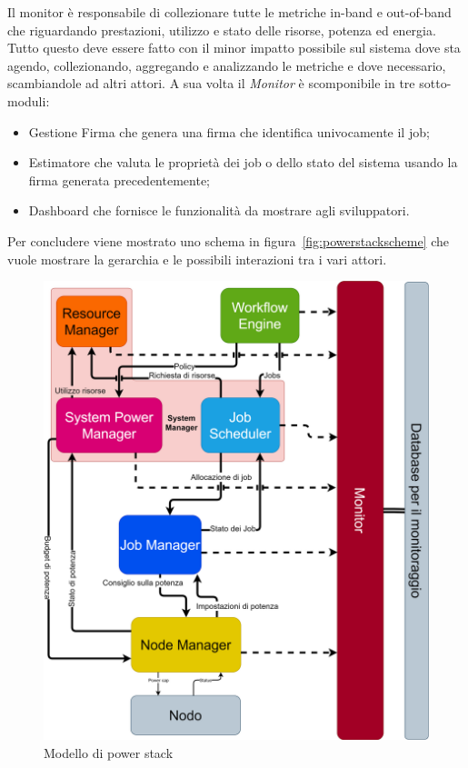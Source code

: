 Il monitor è responsabile di collezionare tutte le metriche in-band e out-of-band che riguardando prestazioni, utilizzo e stato delle risorse, potenza ed energia.
Tutto questo deve essere fatto con il minor impatto possibile sul sistema dove sta agendo, collezionando, aggregando e analizzando le metriche e dove necessario, scambiandole ad altri attori. A sua volta il \emph{Monitor} è scomponibile in tre sotto-moduli:
\begin{itemize}
    \item Gestione Firma che genera una firma che identifica univocamente il job; 
    \item Estimatore che valuta le proprietà dei job o dello stato del sistema usando la firma generata precedentemente;
    \item Dashboard che fornisce le funzionalità da mostrare agli sviluppatori.
\end{itemize}


Per concludere viene mostrato uno schema in figura~\ref{fig:powerstackscheme} che vuole mostrare la gerarchia e le possibili interazioni tra i vari attori.
\begin{figure}[H]
    \centering
    \includegraphics[width=\textwidth]{img/SchemaPowerStack.drawio.png}
    \caption{Modello di power stack}\label{fig:minpowerstackscheme} %
\end{figure}


